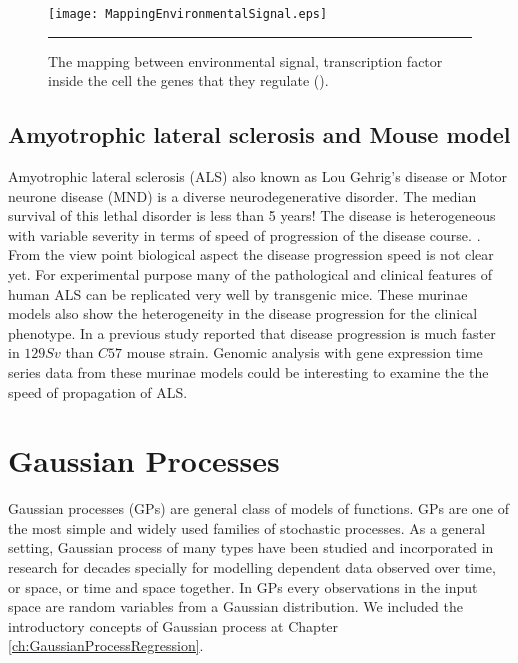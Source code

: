\begin{figure}%
	\centering
		\texttt{[image: MappingEnvironmentalSignal.eps]}
		\rule{35em}{0.5pt}
	\caption[The mapping between environmental signal, transcription factor 
	inside the cell the genes that they regulate]{The mapping between environmental signal, transcription factor 
	inside the cell the genes that they regulate (\cite{Alon:2006}).}
	\label{fig:MappingEnvironmentalSignal}
\end{figure}


\subsection{Amyotrophic lateral sclerosis and Mouse model}

Amyotrophic lateral sclerosis (ALS) also known as Lou Gehrig's disease or 
Motor neurone disease (MND) is a diverse neurodegenerative 
disorder. The median survival of this lethal disorder is less than 5 years!
The disease is heterogeneous with variable severity in terms of speed of 
progression of the disease course. \cite{Brockington:2013, Peviani:2010}. 
From the view point biological aspect the disease progression speed is not clear yet. 
For experimental purpose many of the pathological and clinical features of human 
ALS can be replicated very well by transgenic mice. These murinae models also
show the heterogeneity in the disease progression for the clinical phenotype. 
In a previous study \cite{Pizzasegola:2009} reported that
disease progression is much faster in $129Sv$ than $C57$ mouse strain.
Genomic analysis with gene expression time series data from these murinae models could 
be interesting to examine the the speed of propagation of ALS.

\section{Gaussian Processes}
Gaussian processes (GPs) are general class of models of functions. 
GPs are one of the most simple and widely used families of stochastic processes. 
As a general setting, Gaussian process of many types have been studied and incorporated 
in research for decades specially for modelling dependent data observed over time, or space, 
or time and space together. In GPs every observations in the input space are random variables
from a Gaussian distribution. We included the introductory concepts of Gaussian process at 
Chapter \ref{ch:GaussianProcessRegression}.

